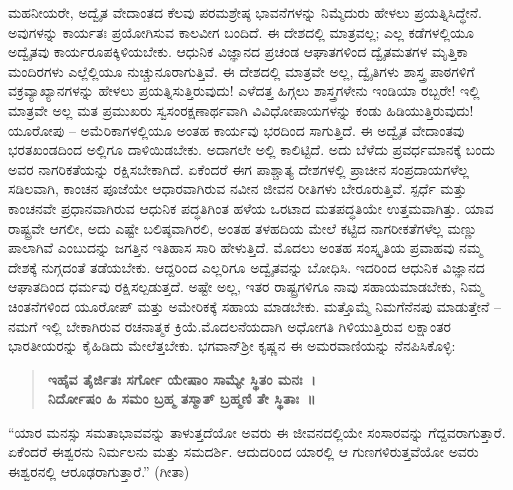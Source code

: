 ಮಹನೀಯರೇ, ಅದ್ವೈತ ವೇದಾಂತದ ಕೆಲವು ಪರಮಶ್ರೇಷ್ಠ ಭಾವನೆಗಳನ್ನು ನಿಮ್ಮೆದುರು ಹೇಳಲು ಪ್ರಯತ್ನಿಸಿದ್ಧೇನೆ. ಅವುಗಳನ್ನು ಕಾರ್ಯತಃ ಪ್ರಯೋಗಿಸುವ ಕಾಲವೀಗ ಬಂದಿದೆ. ಈ ದೇಶದಲ್ಲಿ ಮಾತ್ರವಲ್ಲ; ಎಲ್ಲ ಕಡೆಗಳಲ್ಲಿಯೂ ಅದ್ವೈತವು ಕಾರ್ಯರೂಪಕ್ಕಿಳಿಯಬೇಕು. ಆಧುನಿಕ ವಿಜ್ಞಾನದ ಪ್ರಚಂಡ ಆಘಾತಗಳಿಂದ ದ್ವೈತಮತಗಳ ಮೃತ್ತಿಕಾ ಮಂದಿರಗಳು ಎಲ್ಲೆಲ್ಲಿಯೂ ನುಚ್ಚುನೂರಾಗುತ್ತಿವೆ. ಈ ದೇಶದಲ್ಲಿ ಮಾತ್ರವೇ ಅಲ್ಲ, ದ್ವೈತಿಗಳು ಶಾಸ್ತ್ರ ಪಾಠಗಳಿಗೆ ವಕ್ರವ್ಯಾಖ್ಯಾನಗಳನ್ನು ಹೇಳಲು ಪ್ರಯತ್ನಿಸುತ್ತಿರುವುದು! ಎಳೆದತ್ತ ಹಿಗ್ಗಲು ಶಾಸ್ತ್ರಗಳೇನು ಇಂಡಿಯಾ ರಬ್ಬರೇ! ಇಲ್ಲಿ ಮಾತ್ರವೇ ಅಲ್ಲ ಮತ ಪ್ರಮುಖರು ಸ್ವಸಂರಕ್ಷಣಾರ್ಥವಾಗಿ ವಿವಿಧೋಪಾಯಗಳನ್ನು ಕಂಡು ಹಿಡಿಯುತ್ತಿರುವುದು! ಯೂರೋಪು – ಅಮೆರಿಕಾಗಳಲ್ಲಿಯೂ ಅಂತಹ ಕಾರ್ಯವು ಭರದಿಂದ ಸಾಗುತ್ತಿದೆ. ಈ ಅದ್ವೈತ ವೇದಾಂತವು ಭರತಖಂಡದಿಂದ ಅಲ್ಲಿಗೂ ದಾಳಿಯಿಡಬೇಕು. ಅದಾಗಲೇ ಅಲ್ಲಿ ಕಾಲಿಟ್ಟಿದೆ. ಅದು ಬೆಳೆದು ಪ್ರವರ್ಧಮಾನಕ್ಕೆ ಬಂದು ಅವರ ನಾಗರಿಕತೆಯನ್ನು ರಕ್ಷಿಸಬೇಕಾಗಿದೆ. ಏಕೆಂದರೆ ಈಗ ಪಾಶ್ಚಾತ್ಯ ದೇಶಗಳಲ್ಲಿ ಪ್ರಾಚೀನ ಸಂಪ್ರದಾಯಗಳೆಲ್ಲ ಸಡಿಲವಾಗಿ, ಕಾಂಚನ ಪೂಜೆಯೇ ಆಧಾರವಾಗಿರುವ ನವೀನ ಜೀವನ ರೀತಿಗಳು ಬೇರೂರುತ್ತಿವೆ. ಸ್ಪರ್ಧೆ ಮತ್ತು ಕಾಂಚನವೇ ಪ್ರಧಾನವಾಗಿರುವ ಆಧುನಿಕ ಪದ್ಧತಿಗಿಂತ ಹಳೆಯ ಒರಟಾದ ಮತಪದ್ಧತಿಯೇ ಉತ್ತಮವಾಗಿತ್ತು. ಯಾವ ರಾಷ್ಟ್ರವೇ ಆಗಲೀ, ಅದು ಎಷ್ಟೇ ಬಲಿಷ್ಠವಾಗಿರಲಿ, ಅಂತಹ ತಳಹದಿಯ ಮೇಲೆ ಕಟ್ಟಿದ ನಾಗರೀಕತೆಗಳೆಲ್ಲ ಮಣ್ಣು ಪಾಲಾಗಿವೆ ಎಂಬುದನ್ನು ಜಗತ್ತಿನ ಇತಿಹಾಸ ಸಾರಿ ಹೇಳುತ್ತಿದೆ. ಮೊದಲು ಅಂತಹ ಸಂಸ್ಕೃತಿಯ ಪ್ರವಾಹವು ನಮ್ಮ ದೇಶಕ್ಕೆ ನುಗ್ಗದಂತೆ ತಡೆಯಬೇಕು. ಆದ್ದರಿಂದ ಎಲ್ಲರಿಗೂ ಅದ್ವೈತವನ್ನು ಬೋಧಿಸಿ. ಇದರಿಂದ ಆಧುನಿಕ ವಿಜ್ಞಾನದ ಆಘಾತದಿಂದ ಧರ್ಮವು ರಕ್ಷಿಸಲ್ಪಡುತ್ತದೆ. ಅಷ್ಟೇ ಅಲ್ಲ, ಇತರ ರಾಷ್ಟ್ರಗಳಿಗೂ ನಾವು ಸಹಾಯಮಾಡಬೇಕು, ನಿಮ್ಮ ಚಿಂತನೆಗಳಿಂದ ಯೂರೋಪ್​ ಮತ್ತು ಅಮೇರಿಕಕ್ಕೆ ಸಹಾಯ ಮಾಡಬೇಕು. ಮತ್ತೊಮ್ಮೆ ನಿಮಗೆ\break ನೆನಪು ಮಾಡುತ್ತೇನೆ – ನಮಗೆ ಇಲ್ಲಿ ಬೇಕಾಗಿರುವ ರಚನಾತ್ಮಕ ಕ್ರಿಯೆ.\break ಮೊದಲನೆಯದಾಗಿ ಅಧೋಗತಿ ಗಿಳಿಯುತ್ತಿರುವ ಲಕ್ಷಾಂತರ ಭಾರತೀಯರನ್ನು ಕೈಹಿಡಿದು ಮೇಲೆತ್ತಬೇಕು. ಭಗವಾನ್​ ಶ‍್ರೀ ಕೃಷ್ಣನ ಈ ಅಮರವಾಣಿಯನ್ನು ನೆನಪಿಸಿಕೊಳ್ಳಿ:

\begin{verse}
\textbf{ಇಹೈವ ತೈರ್ಜಿತಃ ಸರ್ಗೋ ಯೇಷಾಂ ಸಾಮ್ಯೇ ಸ್ಥಿತಂ ಮನಃ~।}\\\textbf{ನಿರ್ದೋಷಂ ಹಿ ಸಮಂ ಬ್ರಹ್ಮ ತಸ್ಮಾತ್​ ಬ್ರಹ್ಮಣಿ ತೇ ಸ್ಥಿತಾಃ~॥}
\end{verse}

“ಯಾರ ಮನಸ್ಸು ಸಮತಾಭಾವವನ್ನು ತಾಳುತ್ತದೆಯೋ ಅವರು ಈ ಜೀವನದಲ್ಲಿಯೇ ಸಂಸಾರವನ್ನು ಗೆದ್ದವರಾಗುತ್ತಾರೆ. ಏಕೆಂದರೆ ಈಶ್ವರನು ನಿರ್ಮಲನು ಮತ್ತು ಸಮದರ್ಶಿ. ಆದುದರಿಂದ ಯಾರಲ್ಲಿ ಆ ಗುಣಗಳಿರುತ್ತವೆಯೋ ಅವರು ಈಶ್ವರನಲ್ಲಿ ಆರೂಢರಾಗುತ್ತಾರೆ.” (ಗೀತಾ)

